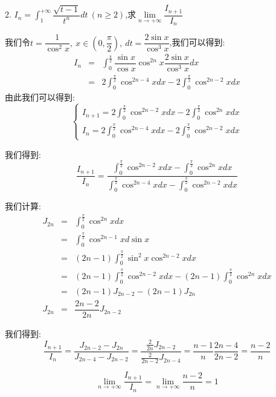 2. $I_{n}=\int_{1}^{+\infty}\dfrac{\sqrt{t-1}}{t^n}dt\ (n\geq 2)$,求$\lim\limits_{n\rightarrow+\infty}\dfrac{I_{n+1}}{I_{n}}$
\begin{solution}
	
	我们令$t=\dfrac{1}{\cos^2 x},\ x\in(0,\dfrac{\pi}{2}),\ dt=\dfrac{2\sin x}{\cos^3 x}$,我们可以得到: 
	\begin{eqnarray*}
		I_{n}&=&\int_{0}^{\frac{\pi}{2}}\dfrac{\sin x}{\cos x}\cos^{2n}x\dfrac{2\sin x}{\cos^3 x}dx\\
		&=&2\int_{0}^{\frac{\pi}{2}}\cos^{2n-4}xdx-2\int_{0}^{\frac{\pi}{2}}\cos^{2n-2}xdx
	\end{eqnarray*}
	由此我们可以得到: 
	$$\left\lbrace
	\begin{array}{l}
		I_{n+1}=2\int_{0}^{\frac{\pi}{2}}\cos^{2n-2}xdx-2\int_{0}^{\frac{\pi}{2}}\cos^{2n}xdx\\
		I_{n}=2\int_{0}^{\frac{\pi}{2}}\cos^{2n-4}xdx-2\int_{0}^{\frac{\pi}{2}}\cos^{2n-2}xdx
	\end{array}
	\right. $$
	
	我们得到: 
	$$\dfrac{I_{n+1}}{I_{n}}=\dfrac{\int_{0}^{\frac{\pi}{2}}\cos^{2n-2}xdx-\int_{0}^{\frac{\pi}{2}}\cos^{2n}xdx}{\int_{0}^{\frac{\pi}{2}}\cos^{2n-4}xdx-\int_{0}^{\frac{\pi}{2}}\cos^{2n-2}xdx}$$
	
	我们计算: 
	\begin{eqnarray*}
		J_{2n}&=&\int_{0}^{\frac{\pi}{2}}\cos^{2n}xdx\\
		&=&\int_{0}^{\frac{\pi}{2}}\cos^{2n-1}xd\sin x\\
		&=&(2n-1)\int_{0}^{\frac{\pi}{2}}\sin^{2} x\cos^{2n-2}xdx\\
		&=&(2n-1)\int_{0}^{\frac{\pi}{2}}\cos^{2n-2}xdx-(2n-1)\int_{0}^{\frac{\pi}{2}}\cos^{2n}xdx\\
		&=&(2n-1)J_{2n-2}-(2n-1)J_{2n}\\
		J_{2n}&=&\dfrac{2n-2}{2n}J_{2n-2}
	\end{eqnarray*}

	我们得到: 
	$$\dfrac{I_{n+1}}{I_{n}}=\dfrac{J_{2n-2}-J_{2n}}{J_{2n-4}-J_{2n-2}}=\dfrac{\frac{2}{2n}J_{2n-2}}{\frac{2}{2n-2}J_{2n-4}}=\dfrac{n-1}{n}\dfrac{2n-4}{2n-2}=\dfrac{n-2}{n}$$
	
	$$\lim\limits_{n\rightarrow+\infty}\dfrac{I_{n+1}}{I_{n}}=\lim\limits_{n\rightarrow+\infty}\dfrac{n-2}{n}=1$$
\end{solution}
